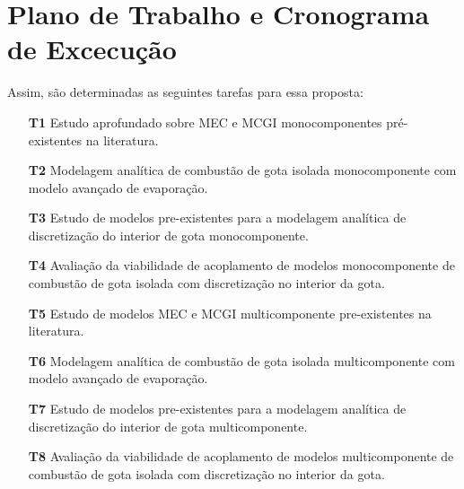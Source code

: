 \section{Plano de Trabalho e Cronograma de Excecução}

Assim, são determinadas as seguintes tarefas para essa proposta:

\begin{itemize}
    \item[\textbf{T1 }] Estudo aprofundado sobre MEC e MCGI monocomponentes pré-existentes na literatura.%
    \item[\textbf{T2 }] Modelagem analítica de combustão de gota isolada monocomponente com modelo avançado de evaporação.%
    \item[\textbf{T3 }] Estudo de modelos pre-existentes para a modelagem  analítica de discretização do interior de gota monocomponente.%
    \item[\textbf{T4 }] Avaliação da viabilidade de acoplamento de modelos monocomponente de combustão de gota isolada com discretização no interior da gota.%

    \item[\textbf{T5 }] Estudo de modelos MEC e MCGI multicomponente pre-existentes na literatura.%
    \item[\textbf{T6 }]  Modelagem analítica de combustão de gota isolada multicomponente com modelo avançado de evaporação.%
    \item[\textbf{T7 }] Estudo de modelos pre-existentes para a modelagem analítica de discretização do interior de gota multicomponente.%
    \item[\textbf{T8 }] Avaliação da viabilidade de acoplamento de modelos multicomponente de combustão de gota isolada com discretização no interior da gota. 
    

\end{itemize}
